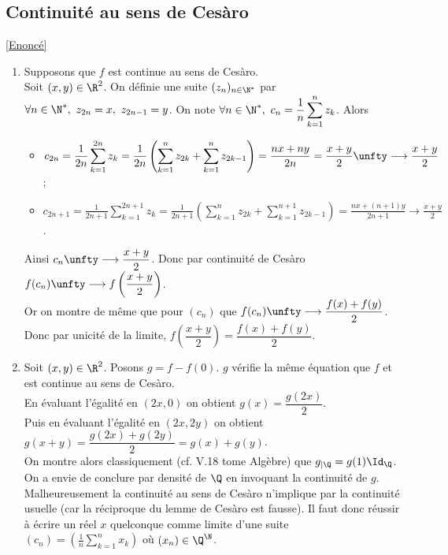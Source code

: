 \documentclass{book}
\begin{document}
	\subsection{Continuité au sens de Cesàro }
	\label{Continuité au sens de Cesàro corrigé}
	\textcolor{blue}{\hyperref[Continuité au sens de Cesàro]{[Enoncé]}}\\
	\begin{enumerate}[leftmargin=*]
		\item Supposons que $f$ est continue au sens de Cesàro.\\
		Soit $(x,y)\in \R^2$. On définie une suite $(z_n)_{n\in \N^*}$ par $\forall n\in \N^*,\ z_{2n}=x,\ z_{2n-1}=y$. On note $\forall n\in \N^*,\ c_n=\displaystyle\frac{1}{n}\sum_{k=1}^nz_k$. Alors\\
		\begin{itemize}
			\item $c_{2n}=\displaystyle\frac{1}{2n}\sum_{k=1}^{2n}z_k=\frac{1}{2n}\left(\sum_{k=1}^nz_{2k}+\sum_{k=1}^nz_{2k-1}\right)=\frac{nx+ny}{2n}=\frac{x+y}{2}\unfty\longrightarrow\frac{x+y}{2}$;
			\item $c_{2n+1}=\displaystyle\frac{1}{2n+1}\sum_{k=1}^{2n+1}z_k=\frac{1}{2n+1}\left(\sum_{k=1}^nz_{2k}+\sum_{k=1}^{n+1}z_{2k-1}\right)=\frac{nx+(n+1)y}{2n+1}\longrightarrow\frac{x+y}{2}$.
		\end{itemize}
		Ainsi $c_n\unfty\longrightarrow\dfrac{x+y}{2}$. Donc par continuité de Cesàro $f(c_n)\unfty\longrightarrow f\left(\dfrac{x+y}{2}\right)$.\\
		Or on montre de même que pour $(c_n)$ que $f(c_n)\unfty\longrightarrow\dfrac{f(x)+f(y)}{2}$.\\
		Donc par unicité de la limite, $f\left(\dfrac{x+y}{2}\right)=\dfrac{f(x)+f(y)}{2}$.
		\item Soit $(x,y)\in \R^2$. Posons $g=f-f(0)$. $g$ vérifie la même équation que $f$ et est continue au sens de Cesàro.\\
		En évaluant l'égalité en $(2x,0)$ on obtient $g(x)=\dfrac{g(2x)}{2}$.\\
		Puis en évaluant l'égalité en $(2x,2y)$ on obtient $g(x+y)=\dfrac{g(2x)+g(2y)}{2}=g(x)+g(y)$.\\
		On montre alors classiquement (cf. V.18 tome Algèbre) que $g_{|\Q}=g(1)\Id_\Q$.\\
		On a envie de conclure par densité de $\Q$ en invoquant la continuité de $g$. Malheureusement la continuité au sens de Cesàro n'implique par la continuité usuelle (car la réciproque du lemme de Cesàro est fausse). Il faut donc réussir à écrire un réel $x$ quelconque comme limite d'une suite $(c_n)=\left(\displaystyle\frac{1}{n}\sum_{k=1}^nx_k\right)$ où $(x_n)\in \Q^\N$.\\

\end{enumerate}
\end{document}
